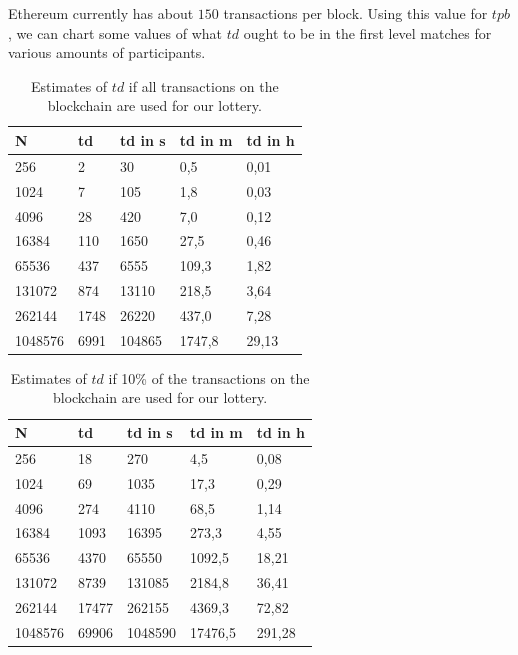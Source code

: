 Ethereum currently has about $150$ transactions per block. Using this value for $tpb$, we can chart some values of what $td$ ought to be in the first level matches for various amounts of participants.

\begin{table}[h]
\centering
\caption{Estimates of $td$ if all transactions on the blockchain are used for our lottery.}
\label{tab:td-100percent-transactions}
\begin{tabular}{|l|l|l|l|l|}
\hline

N & td & td in s & td in m & td in h \\ \hline
256 & 2 & 30 & 0,5 & 0,01 \\ \hline
1024 & 7 & 105 & 1,8 & 0,03 \\ \hline
4096 & 28 & 420 & 7,0 & 0,12 \\ \hline
16384 & 110 & 1650 & 27,5 & 0,46 \\ \hline
65536 & 437 & 6555 & 109,3 & 1,82 \\ \hline
131072 & 874 & 13110 & 218,5 & 3,64 \\ \hline
262144 & 1748 & 26220 & 437,0 & 7,28 \\ \hline
1048576 & 6991 & 104865 & 1747,8 & 29,13 \\ \hline

\end{tabular}
\end{table}

\begin{table}[h]
\centering
\caption{Estimates of $td$ if 10\% of the transactions on the blockchain are used for our lottery.}
\label{tab:td-10percent-transactions}
\begin{tabular}{|l|l|l|l|l|}
\hline

N & td & td in s & td in m & td in h \\ \hline
256 & 18 & 270 & 4,5 & 0,08 \\ \hline
1024 & 69 & 1035 & 17,3 & 0,29 \\ \hline
4096 & 274 & 4110 & 68,5 & 1,14 \\ \hline
16384 & 1093 & 16395 & 273,3 & 4,55 \\ \hline
65536 & 4370 & 65550 & 1092,5 & 18,21 \\ \hline
131072 & 8739 & 131085 & 2184,8 & 36,41 \\ \hline
262144 & 17477 & 262155 & 4369,3 & 72,82 \\ \hline
1048576 & 69906 & 1048590 & 17476,5 & 291,28 \\ \hline

\end{tabular}
\end{table}

